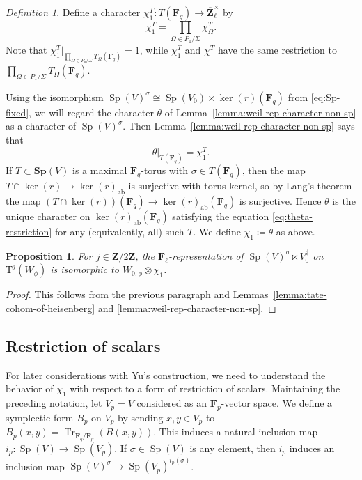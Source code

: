 \documentclass[reqno]{amsart}
\numberwithin{equation}{subsection}
\newcommand{\F}{\mathbf{F}}
\newcommand{\Z}{\mathbf{Z}}
\newcommand{\ol}[1]{\overline{#1}}
\newcommand{\co}{\colon}
\DeclareMathOperator{\ab}{ab}
\DeclareMathOperator{\Tr}{Tr}
\DeclareMathOperator{\Sp}{Sp}
\newcommand{\rT}{\ensuremath{\mathrm{T}}\xspace}
\newtheorem{prop}[thm]{Proposition}
\theoremstyle{remark}
\newtheorem{defn}[thm]{Definition}
\numberwithin{equation}{subsection}
\numberwithin{figure}{subsection}
\begin{document}
\begin{defn}\label{def:chi-sigma}Define a character $\chi_1^T\co T(\F_q) \to \ol\Z_\ell^\times$ by
\begin{equation}
\chi_1^T = \prod_{\Omega \in P_1/\Sigma} \chi_\Omega^T.
\end{equation}
Note that $\chi_1^T|_{\prod_{\Omega \in P_0/\Sigma} T_\Omega(\F_q)} = 1$, while $\chi_1^T$ and $\chi^T$ have the same restriction to $\prod_{\Omega \in P_1/\Sigma} T_\Omega(\F_q)$. 

Using the isomorphism $\Sp(V)^\sigma \cong \Sp(V_0) \times \ker(r)(\F_q)$ from \eqref{eq:Sp-fixed}, we will regard the character $\theta$ of Lemma~\ref{lemma:weil-rep-character-non-sp} as a character of $\Sp(V)^\sigma$. Then Lemma~\ref{lemma:weil-rep-character-non-sp} says that 
\begin{equation}\label{eq:theta-restriction}
\theta|_{T(\F_q)} = \ol \chi_1^T.
\end{equation}
If $T \subset \mathbf{Sp}(V)$ is a maximal $\F_q$-torus with $\sigma \in T(\F_q)$, then the map $T \cap \ker(r) \to \ker(r)_{\ab}$ is surjective with torus kernel, so by Lang's theorem the map $(T \cap \ker(r))(\F_q) \to \ker(r)_{\ab}(\F_q)$ is surjective. Hence $\theta$ is the unique character on $\ker(r)_{\ab}(\F_q)$ satisfying the equation \eqref{eq:theta-restriction} for any (equivalently, all) such $T$. We define $\chi_1 \coloneqq \theta$ as above.
\end{defn}


\begin{prop}\label{prop:tate-cohom-of-weil}
For $j\in \Z/2\Z$, the $\ol\F_\ell$-representation of $\Sp(V)^\sigma \ltimes V_0^\sharp$ on $\rT^j(W_\phi)$ is isomorphic to $W_{0,\phi} \otimes \chi_1$.
\end{prop}

\begin{proof}
This follows from the previous paragraph and Lemmas~\ref{lemma:tate-cohom-of-heisenberg} and \ref{lemma:weil-rep-character-non-sp}.
\end{proof}

\subsection{Restriction of scalars}\label{ss:weil-heisenberg-restriction-of-scalars}

For later considerations with Yu's construction, we need to understand the behavior of $\chi_1$ with respect to a form of restriction of scalars. Maintaining the preceding notation, let $V_p = V$ considered as an $\F_p$-vector space. We define a symplectic form $B_p$ on $V_p$ by sending $x, y \in V_p$ to $B_p(x, y) = \Tr_{\F_q/\F_p}(B(x,y))$. This induces a natural inclusion map $i_p\co\Sp(V) \to \Sp(V_p)$. If $\sigma \in \Sp(V)$ is any element, then $i_p$ induces an inclusion map $\Sp(V)^\sigma \to \Sp(V_p)^{i_p(\sigma)}$.
\end{document}
